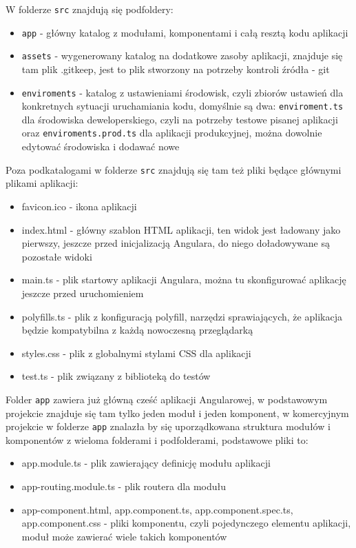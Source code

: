 \documentclass[12pt,a4paper,oneside]{book}
\begin{document}
W folderze \texttt{src} znajdują się podfoldery:

\begin{itemize}
  \item \texttt{app} - główny katalog z modułami, komponentami i całą resztą kodu aplikacji
  \item \texttt{assets} - wygenerowany katalog na dodatkowe zasoby aplikacji, znajduje się tam plik .gitkeep, jest to plik stworzony na potrzeby kontroli źródła - git
  \item \texttt{enviroments} - katalog z ustawieniami środowisk, czyli zbiorów ustawień dla konkretnych sytuacji uruchamiania kodu, domyślnie są dwa: \texttt{enviroment.ts} dla środowiska deweloperskiego, czyli na potrzeby testowe pisanej aplikacji oraz \texttt{enviroments.prod.ts} dla aplikacji produkcyjnej, można dowolnie edytować środowiska i dodawać nowe
\end{itemize}

Poza podkatalogami w folderze \texttt{src} znajdują się tam też pliki będące głównymi plikami aplikacji: 

\begin{itemize}
  \item favicon.ico - ikona aplikacji
  \item index.html - główny szablon HTML aplikacji, ten widok jest ładowany jako pierwszy, jeszcze przed inicjalizacją Angulara, do niego doładowywane są pozostałe widoki
  \item main.ts - plik startowy aplikacji Angulara, można tu skonfigurować aplikację jeszcze przed uruchomieniem
  \item polyfills.ts - plik z konfiguracją polyfill, narzędzi sprawiających, że aplikacja będzie kompatybilna z każdą nowoczesną przeglądarką
  \item styles.css - plik z globalnymi stylami CSS dla aplikacji
  \item test.ts - plik związany z biblioteką do testów
\end{itemize}

Folder \texttt{app} zawiera już główną cześć aplikacji Angularowej, w podstawowym projekcie znajduje się tam tylko jeden moduł i jeden komponent, w komercyjnym projekcie w folderze \texttt{app} znalazła by się uporządkowana struktura modułów i komponentów z wieloma folderami i podfolderami, podstawowe pliki to:

\begin{itemize}
  \item app.module.ts - plik zawierający definicję modułu aplikacji
  \item app-routing.module.ts - plik routera dla modułu
  \item app-component.html, app.component.ts, app.component.spec.ts,\\ app.component.css - pliki komponentu, czyli pojedynczego elementu aplikacji, moduł może zawierać wiele takich komponentów
\end{itemize}
\end{document}
